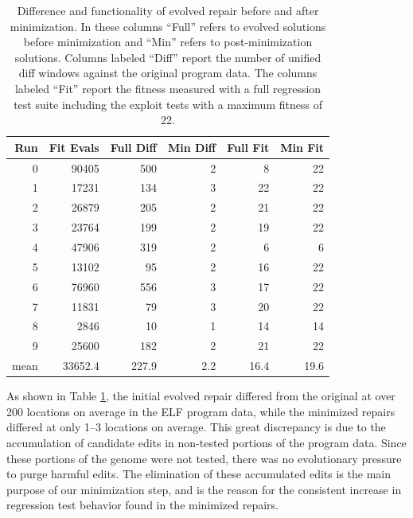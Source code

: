 \documentclass{sigcomm-alternate}
\begin{document}
\begin{table}[htb]
\centering
\begin{tabular}{rrrrrr}
Run  & Fit Evals & Full Diff & Min Diff & Full Fit & Min Fit \\
\toprule
0    & 90405     & 500       & 2        & 8        & 22      \\
1    & 17231     & 134       & 3        & 22       & 22      \\
2    & 26879     & 205       & 2        & 21       & 22      \\
3    & 23764     & 199       & 2        & 19       & 22      \\
4    & 47906     & 319       & 2        & 6        & 6       \\
5    & 13102     & 95        & 2        & 16       & 22      \\
6    & 76960     & 556       & 3        & 17       & 22      \\
7    & 11831     & 79        & 3        & 20       & 22      \\
8    & 2846      & 10        & 1        & 14       & 14      \\
9    & 25600     & 182       & 2        & 21       & 22      \\
\bottomrule
mean & 33652.4   & 227.9     & 2.2      & 16.4     & 19.6    \\
\end{tabular}
\caption{\label{minimized-stats}Difference and functionality of
evolved repair before and after minimization.  In these columns ``Full''
refers to evolved solutions before minimization and ``Min'' refers to
post-minimization solutions.  Columns labeled ``Diff'' report the number
of unified diff windows against the original program data. The columns
labeled ``Fit'' report the fitness measured with a full regression test
suite including the exploit tests with a maximum fitness of 22.}
\end{table}

As shown in Table \ref{minimized-stats}, the initial evolved repair
differed from the original at over 200 locations on average in the ELF
program data, while the minimized repairs differed at only 1--3
locations on average.  This great discrepancy is due to the
accumulation of candidate edits in non-tested portions of the program
data.  Since these portions of the genome were not tested, there was
no evolutionary pressure to purge harmful edits.  The elimination of
these accumulated edits is the main purpose of our minimization step,
and is the reason for the consistent increase in regression test
behavior found in the minimized repairs.
\end{document}

